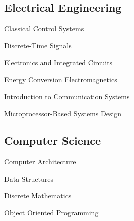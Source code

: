\documentclass[]{hieudo-build}
\begin{document}
\begin{minipage}[t]{0.34\textwidth}
\subsection{Electrical Engineering}
\vspace{0.7em} %
\begin{tightemize}
\scriptsize{}
	\item Classical Control Systems    
    \item Discrete-Time Signals
    \item Electronics and Integrated Circuits
    \item Energy Conversion Electromagnetics 
    \item Introduction to Communication Systems 
    \item Microprocessor-Based Systems Design
\end{tightemize}

\subsection{Computer Science}
\vspace{0.4em} %
\begin{tightemize}
\scriptsize{}
    \vspace{0.7em} %
    \item Computer Architecture
    \item Data Structures
    \item Discrete Mathematics
    \item Object Oriented Programming
\end{tightemize}





\sectionsep


\end{minipage}
\end{document}
